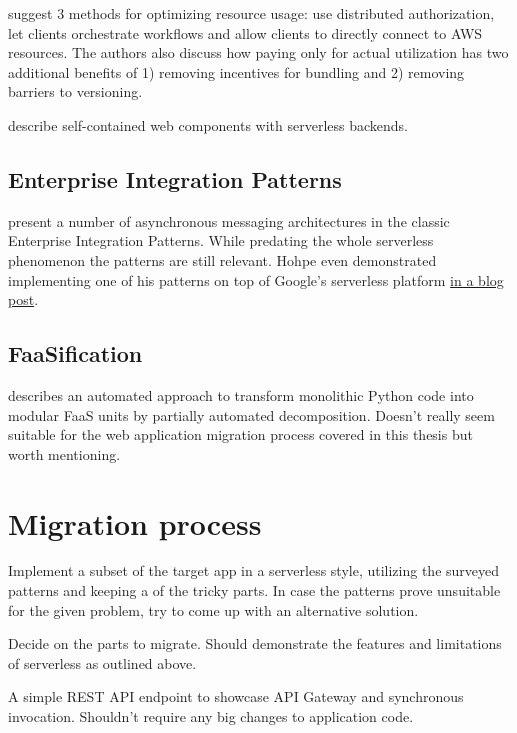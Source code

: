 \documentclass[utf8,english]{gradu3}
\begin{document}
\textcite{adzic2017serverless} suggest 3 methods for optimizing resource usage: use distributed authorization, let clients orchestrate workflows and allow clients to directly connect to AWS resources. The authors also discuss how paying only for actual utilization has two additional benefits of 1) removing incentives for bundling and 2) removing barriers to versioning.

\textcite{ast17webcomponent} describe self-contained web components with serverless backends.

\section{Enterprise Integration Patterns}

\textcite{hohpe2004enterprise} present a number of asynchronous messaging architectures in the classic Enterprise Integration Patterns. While predating the whole serverless phenomenon the patterns are still relevant. Hohpe even demonstrated implementing one of his patterns on top of Google's serverless platform \href{http://www.enterpriseintegrationpatterns.com/ramblings/google_cloud_functions.html}{in a blog post}.

\section{FaaSification}

\textcite{spillner17transformpython} describes an automated approach to transform monolithic Python code into modular FaaS units by partially automated decomposition. Doesn't really seem suitable for the web application migration process covered in this thesis but worth mentioning.

\chapter{Migration process}

Implement a subset of the target app in a serverless style, utilizing the surveyed patterns and keeping a of the tricky parts. In case the patterns prove unsuitable for the given problem, try to come up with an alternative solution.

Decide on the parts to migrate. Should demonstrate the features and limitations of serverless as outlined above.

A simple REST API endpoint to showcase API Gateway and synchronous invocation. Shouldn't require any big changes to application code.
\end{document}
